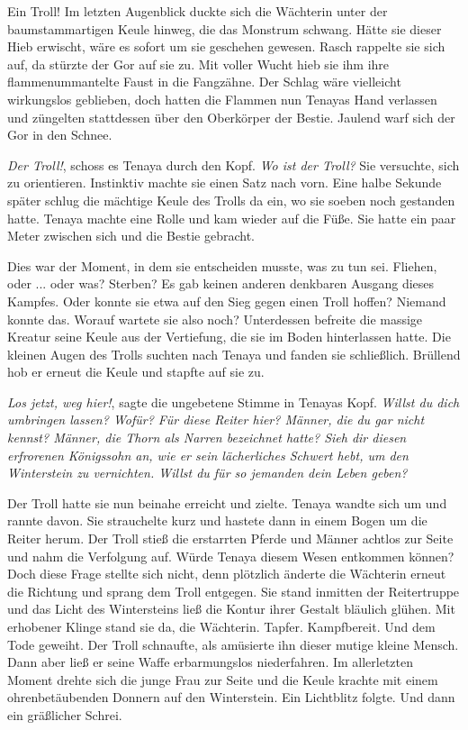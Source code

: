 \documentclass[10pt, a4paper, oneside]{book}
\begin{document}
\begin{multicols}{2}
Ein Troll! Im letzten Augenblick duckte sich die Wächterin unter der baumstammartigen Keule hinweg, die das Monstrum schwang. Hätte sie dieser Hieb erwischt, wäre es sofort um sie geschehen gewesen. Rasch rappelte sie sich auf, da stürzte der Gor auf sie zu. Mit voller Wucht hieb sie ihm ihre flammenummantelte Faust in die Fangzähne. Der Schlag wäre vielleicht wirkungslos geblieben, doch hatten die Flammen nun Tenayas Hand verlassen und züngelten stattdessen über den Oberkörper der Bestie. Jaulend warf sich der Gor in den Schnee. 

\textit{Der Troll!}, schoss es Tenaya durch den Kopf. \textit{Wo ist der Troll?} Sie versuchte, sich zu orientieren. Instinktiv machte sie einen Satz nach vorn. Eine halbe Sekunde später schlug die mächtige Keule des Trolls da ein, wo sie soeben noch gestanden hatte. Tenaya machte eine Rolle und kam wieder auf die Füße. Sie hatte ein paar Meter zwischen sich und die Bestie gebracht.

Dies war der Moment, in dem sie entscheiden musste, was zu tun sei. Fliehen, oder ... oder was? Sterben? Es gab keinen anderen denkbaren Ausgang dieses Kampfes. Oder konnte sie etwa auf den Sieg gegen einen Troll hoffen? Niemand konnte das. Worauf wartete sie also noch? Unterdessen befreite die massige Kreatur seine Keule aus der Vertiefung, die sie im Boden hinterlassen hatte. Die kleinen Augen des Trolls suchten nach Tenaya und fanden sie schließlich. Brüllend hob er erneut die Keule und stapfte auf sie zu.

\textit{Los jetzt, weg hier!}, sagte die ungebetene Stimme in Tenayas Kopf. \textit{Willst du dich umbringen lassen? Wofür? Für diese Reiter hier? Männer, die du gar nicht kennst? Männer, die Thorn als Narren bezeichnet hatte? Sieh dir diesen erfrorenen Königssohn an, wie er sein lächerliches Schwert hebt, um den Winterstein zu vernichten. Willst du für so jemanden dein Leben geben?}

Der Troll hatte sie nun beinahe erreicht und zielte. Tenaya wandte sich um und rannte davon. Sie strauchelte kurz und hastete dann in einem Bogen um die Reiter herum. Der Troll stieß die erstarrten Pferde und Männer achtlos zur Seite und nahm die Verfolgung auf. Würde Tenaya diesem Wesen entkommen können? Doch diese Frage stellte sich nicht, denn plötzlich änderte die Wächterin erneut die Richtung und sprang dem Troll entgegen. Sie stand inmitten der Reitertruppe und das Licht des Wintersteins ließ die Kontur ihrer Gestalt bläulich glühen. Mit erhobener Klinge stand sie da, die Wächterin. Tapfer. Kampfbereit. Und dem Tode geweiht. Der Troll schnaufte, als amüsierte ihn dieser mutige kleine Mensch. Dann aber ließ er seine Waffe erbarmungslos niederfahren. Im allerletzten Moment drehte sich die junge Frau zur Seite und die Keule krachte mit einem ohrenbetäubenden Donnern auf den Winterstein. Ein Lichtblitz folgte. Und dann ein gräßlicher Schrei. 


\end{multicols}
\end{document}
